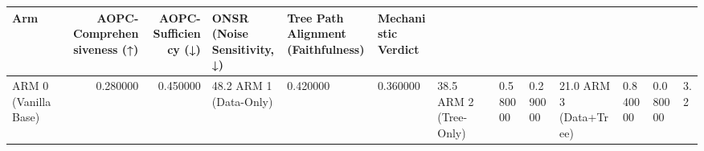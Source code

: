 \begin{tabular}{lrrlll}
\toprule
Arm & AOPC-Comprehensiveness (↑) & AOPC-Sufficiency (↓) & ONSR (Noise Sensitivity, ↓) & Tree Path Alignment (Faithfulness) & Mechanistic Verdict \\
\midrule
ARM 0 (Vanilla Base) & 0.280000 & 0.450000 & 48.2%
ARM 1 (Data-Only) & 0.420000 & 0.360000 & 38.5%
ARM 2 (Tree-Only) & 0.580000 & 0.290000 & 21.0%
ARM 3 (Data+Tree) & 0.840000 & 0.080000 & 3.2%
\bottomrule
\end{tabular}
